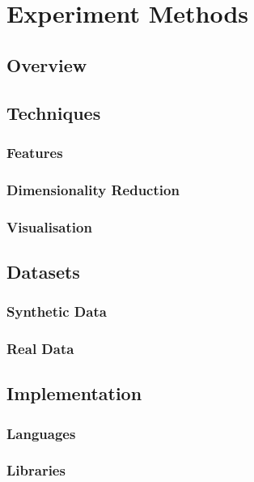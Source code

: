 \chapter{Experiment Methods}

\section{Overview}

\section{Techniques}
\subsection{Features}
\subsection{Dimensionality Reduction}
\subsection{Visualisation}

\section{Datasets}
\subsection{Synthetic Data}
\subsection{Real Data}

\section{Implementation}
\subsection{Languages}
\subsection{Libraries}